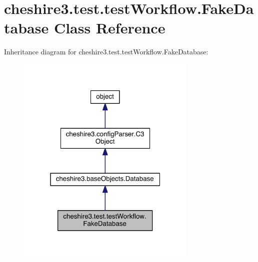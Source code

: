 \hypertarget{classcheshire3_1_1test_1_1test_workflow_1_1_fake_database}{\section{cheshire3.\-test.\-test\-Workflow.\-Fake\-Database Class Reference}
\label{classcheshire3_1_1test_1_1test_workflow_1_1_fake_database}
}


Inheritance diagram for cheshire3.\-test.\-test\-Workflow.\-Fake\-Database\-:
\nopagebreak
\begin{figure}[H]
\begin{center}
\leavevmode
\includegraphics[width=244pt]{classcheshire3_1_1test_1_1test_workflow_1_1_fake_database__inherit__graph}
\end{center}
\end{figure}


